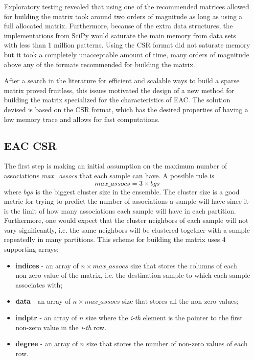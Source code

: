 Exploratory testing revealed that using one of the recommended matrices allowed for building the matrix took around two orders of magnitude as long as using a full allocated matrix.
Furthermore, because of the extra data structures, the implementations from SciPy would saturate the main memory from data sets with less than 1 million patterns.
Using the CSR format did not saturate memory but it took a completely unacceptable amount of time, many orders of magnitude above any of the formats recommended for building the matrix.

After a search in the literature for efficient and scalable ways to build a sparse matrix proved fruitless, this issues motivated the design of a new method for building the matrix specialized for the characteristics of EAC.
The solution devised is based on the CSR format, which has the desired properties of having a low memory trace and allows for fast computations.

\subsection{EAC CSR}

The first step is making an initial assumption on the maximum number of associations \emph{max\_assocs} that each sample can have.
A possible rule is $$max\_assocs = 3 \times bgs$$ where $bgs$ is the biggest cluster size in the ensemble.
The cluster size is a good metric for trying to predict the number of associations a sample will have since it is the limit of how many associations each sample will have in each partition.
Furthermore, one would expect that the cluster neighbors of each sample will not vary significantly, i.e. the same neighbors will be clustered together with a sample repeatedly in many partitions.
This scheme for building the matrix uses 4 supporting arrays:

\begin{itemize}
	\item \textbf{indices} - an array of $n \times max\_assocs$ size that stores the columns of each non-zero value of the matrix, i.e. the destination sample to which each sample associates with;
	\item \textbf{data} - an array of $n \times max\_assocs$ size that stores all the non-zero values;
	\item \textbf{indptr} - an array of $n$ size where the \emph{i-th} element is the pointer to the first non-zero value in the \emph{i-th} row.
	\item \textbf{degree} - an array of $n$ size that stores the number of non-zero values of each row.
\end{itemize}

